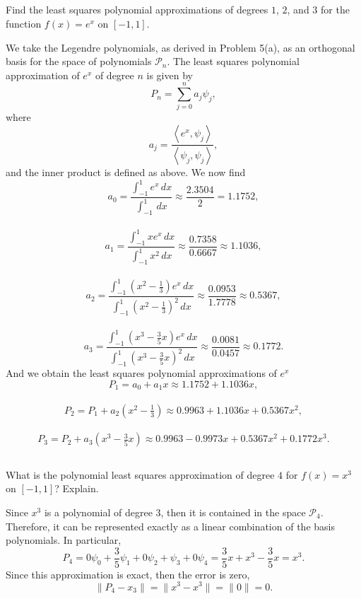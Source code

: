 \documentclass[12pt]{article}
\newenvironment{problem}
    {\begin{lrbox}{\mybox}\begin{minipage}{0.98\textwidth}}
    {\end{minipage}\end{lrbox}\framebox[\textwidth]{\usebox{\mybox}}}
\newcommand{\<}{\left\langle}
\renewcommand{\>}{\right\rangle}
\newcommand{\PP}{\mathcal{P}}
\begin{document}
\subsection{}
\begin{problem}
    Find the least squares polynomial approximations of degrees $1$, $2$, and $3$ for the function $f(x) = e^x$ on $[-1, 1]$.
\end{problem}
\medskip

We take the Legendre polynomials, as derived in Problem 5(a), as an orthogonal basis for the space of polynomials $\PP_n$. The least squares polynomial approximation of $e^x$ of degree $n$ is given by
\[
    P_n = \sum_{j=0}^n a_j \psi_j,
\]
where
\[
    a_j =  \frac{\< e^x, \psi_j\>}{\<\psi_j, \psi_j\>},
\]
and the inner product is defined as above. We now find
\[
    a_0 = \frac{\int_{-1}^1 e^x \,dx}{\int_{-1}^1 \,dx} \approx \frac{2.3504}{2} = 1.1752,
\]\\
\[
    a_1 = \frac{\int_{-1}^1 xe^x \,dx}{\int_{-1}^1 x^2 \,dx} \approx \frac{0.7358}{0.6667} \approx 1.1036,
\]\\
\[
    a_2 = \frac{\int_{-1}^1 (x^2 - \frac13)e^x \,dx}{\int_{-1}^1 (x^2 - \frac13)^2 \,dx} \approx \frac{0.0953}{1.7778} \approx 0.5367,
\]\\
\[
    a_3 = \frac{\int_{-1}^1 (x^3 - \tfrac35x)e^x \,dx}{\int_{-1}^1 (x^3 - \tfrac35x)^2 \,dx} \approx \frac{0.0081}{0.0457} \approx 0.1772.
\]
And we obtain the least squares polynomial approximations of $e^x$
\[
    P_1 = a_0 + a_1x \approx 1.1752 + 1.1036x,
\]\\
\[
    P_2 = P_1 + a_2(x^2 - \tfrac13) \approx 0.9963 + 1.1036x + 0.5367x^2,
\]\\
\[
    P_3 = P_2 + a_3(x^3 - \tfrac35x) \approx 0.9963 - 0.9973x + 0.5367x^2 + 0.1772x^3.
\]



\subsection{}
\begin{problem}
    What is the polynomial least squares approximation of degree $4$ for $f(x) = x^3$ on $[-1, 1]$? Explain.
\end{problem}
\medskip

Since $x^3$ is a polynomial of degree $3$, then it is contained in the space $\PP_4$. Therefore, it can be represented exactly as a linear combination of the basis polynomials. In particular,
\[
    P_4 = 0\psi_0 + \frac35 \psi_1 + 0\psi_2 + \psi_3 + 0\psi_4 = \frac35x + x^3 - \frac35x = x^3.
\]
Since this approximation is exact, then the error is zero,
\[
    \|P_4 - x_3\| = \|x^3 - x^3\| = \|0\| = 0.
\]
\end{document}
